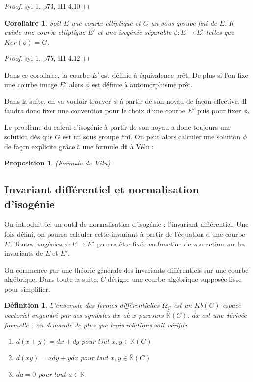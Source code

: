 \documentclass{article}
\newcommand{\K}[0]{\mathbb{K}}
\newcommand{\Kb}[0]{\bar{\K}}
\newtheorem{Prop}[The]{Proposition}
\newtheorem{Def}[The]{Définition}
\newtheorem{Coro}[The]{Corollaire}
\begin{document}
\begin{proof}
	
	syl 1, p73, III 4.10
	
\end{proof}

\begin{Coro}
	Soit $E$ une courbe elliptique et $G$ un sous groupe fini de $E$. Il existe une courbe elliptique $E'$ et une isogénie séparable $\phi : E \rightarrow E'$ telles que $Ker(\phi) = G$.
\end{Coro}

\begin{proof}
	
	syl 1, p75, III 4.12
	
\end{proof}


Dans ce corollaire, la courbe $E'$ est définie à équivalence prêt. De plus si l'on fixe une courbe image $E'$ alors $\phi$ est définie à automorphisme prêt. 

Dans la suite, on va vouloir trouver $\phi$ à partir de son noyau de façon effective. Il faudra donc fixer une convention pour le choix d'une courbe $E'$ puis pour fixer $\phi$.

Le problème du calcul d'isogénie à partir de son noyau a donc toujours une solution dès que $G$ est un sous groupe fini. On peut alors calculer une solution $\phi$ de façon explicite grâce à une formule dû à Vélu :

\begin{Prop}
	(Formule de Vélu)
	
	
\end{Prop}



\subsection{Invariant différentiel et normalisation d'isogénie}

On introduit ici un outil de normalisation d'isogénie : l'invariant différentiel. Une fois défini, on pourra calculer cette invariant à partir de l'équation d'une courbe $E$. Toutes isogénies $\phi : E\rightarrow E'$ pourra être fixée en fonction de son action sur les invariants de $E$ et $E'$. 

On commence par une théorie générale des invariants différentiels sur une courbe algébrique. Dans toute la suite, $C$ désigne une courbe algébrique supposée lisse pour simplifier. 

\begin{Def}
	L'ensemble des formes différentielles $\Omega_{C}$ est un $Kb(C)$-espace vectoriel engendré par des symboles $dx$ où $x$ parcours $\Kb(C)$.
	$dx$ est une dérivée formelle : on demande de plus que trois relations soit vérifiée
	\begin{enumerate}
		\item $d(x+y) = dx + dy$ pour tout $x, y \in\Kb(C)$
		\item $d(xy) = xdy + ydx$ pour tout $x, y \in\Kb(C)$
		\item $da = 0$ pour tout $a\in\Kb$
	\end{enumerate}
\end{Def}
\end{document}
